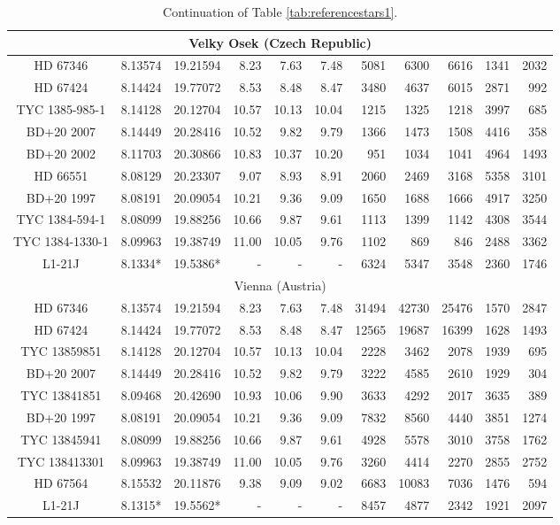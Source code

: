 \begin{table*}
{\begin{tabular}{c|cc|rrr|rrr|rr}
\hline
\multicolumn{11}{c}{Velky Osek (Czech Republic)}\\
\hline
HD 67346 & 8.13574 & 19.21594 & 8.23 & 7.63 & 7.48 & 5081 & 6300 & 6616 & 1341 & 2032\\
HD 67424 & 8.14424 & 19.77072 & 8.53 & 8.48 & 8.47 & 3480 & 4637 & 6015 & 2871 & 992\\
TYC 1385-985-1 & 8.14128 & 20.12704 & 10.57 & 10.13 & 10.04 & 1215 & 1325 & 1218 & 3997 & 685\\
BD+20 2007 & 8.14449 & 20.28416 & 10.52 & 9.82 & 9.79 & 1366 & 1473 & 1508 & 4416 & 358\\
BD+20 2002 & 8.11703 & 20.30866 & 10.83 & 10.37 & 10.20 & 951 & 1034 & 1041 & 4964 & 1493\\
HD 66551 & 8.08129 & 20.23307 & 9.07 & 8.93 & 8.91 & 2060 & 2469 & 3168 & 5358 & 3101\\
BD+20 1997 & 8.08191 & 20.09054 & 10.21 & 9.36 & 9.09 & 1650 & 1688 & 1666 & 4917 & 3250\\
TYC 1384-594-1 & 8.08099 & 19.88256 & 10.66 & 9.87 & 9.61 & 1113 & 1399 & 1142 & 4308 & 3544\\
TYC 1384-1330-1 & 8.09963 & 19.38749 & 11.00 & 10.05 & 9.76 & 1102 & 869 & 846 & 2488 & 3362\\
L1-21J & 8.1334* & 19.5386* & - & - & - & 6324 & 5347 & 3548 & 2360 & 1746\\

\hline
\multicolumn{11}{c}{Vienna (Austria)}\\
\hline
HD 67346 & 8.13574 & 19.21594 & 8.23 & 7.63 & 7.48 & 31494 & 42730 & 25476 & 1570 & 2847\\
HD 67424 & 8.14424 & 19.77072 & 8.53 & 8.48 & 8.47 & 12565 & 19687 & 16399 & 1628 & 1493\\
TYC 13859851 & 8.14128 & 20.12704 & 10.57 & 10.13 & 10.04 & 2228 & 3462 & 2078 & 1939 & 695\\
BD+20 2007 & 8.14449 & 20.28416 & 10.52 & 9.82 & 9.79 & 3222 & 4585 & 2610 & 1929 & 304\\
TYC 13841851 & 8.09468 & 20.42690 & 10.93 & 10.06 & 9.90 & 3633 & 4292 & 2017 & 3635 & 389\\
BD+20 1997 & 8.08191 & 20.09054 & 10.21 & 9.36 & 9.09 & 7832 & 8560 & 4440 & 3851 & 1274\\
TYC 13845941 & 8.08099 & 19.88256 & 10.66 & 9.87 & 9.61 & 4928 & 5578 & 3010 & 3758 & 1762\\
TYC 138413301 & 8.09963 & 19.38749 & 11.00 & 10.05 & 9.76 & 3260 & 4414 & 2270 & 2855 & 2752\\
HD 67564 & 8.15532 & 20.11876 & 9.38 & 9.09 & 9.02 & 6683 & 10083 & 7036 & 1476 & 594\\
L1-21J & 8.1315* & 19.5562* & - & - & - & 8457 & 4877 & 2342 & 1921 & 2097\\

\hline\hline
\end{tabular}}
\caption{Continuation of Table \ref{tab:referencestars1}.\label{tab:referencestars2}}
\end{table*}
